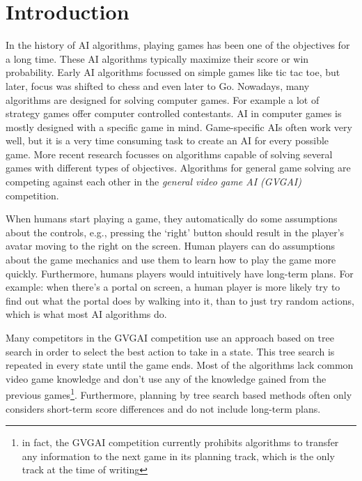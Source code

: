\section{Introduction}
\label{sec:introduction}
In the history of AI algorithms, playing games has been one of the objectives
for a long time. These AI algorithms typically maximize their score or win
probability. Early AI algorithms focussed on simple games like tic tac toe, but
later, focus was shifted to chess and even later to Go. Nowadays, many
algorithms are designed for solving computer games. For example a lot of
strategy games offer computer controlled contestants. AI in computer games is
mostly designed with a specific game in mind.  
Game-specific AIs often work very well, but it is a very time consuming
task to create an AI for every possible game. More recent research focusses
on algorithms capable of solving several games with different types of
objectives. Algorithms for general game solving are competing against each other
in the \emph{general video game AI (GVGAI)} competition\cite{perez2014}. 

When humans start playing a game, they automatically do some assumptions about
the controls, e.g., pressing the `right' button should result in the player's
avatar moving to the right on the screen. Human players can do
assumptions about the game mechanics and use them to learn how to play the game
more quickly. Furthermore, humans players would intuitively have long-term
plans.  For example: when there's a portal on screen, a human player is more
likely try to find out what the portal does by walking into it, than to just try
random actions, which is what most AI algorithms do.

Many competitors in the GVGAI competition use an approach based on tree
search in order to select the best action to take in a state. This tree search
is repeated in every state until the game ends. Most of the algorithms lack
common video game knowledge and don't use any of the knowledge gained from the
previous games\footnote{in fact, the GVGAI competition currently prohibits algorithms to
transfer any information to the next game in its planning track, which is the
only track at the time of writing}. Furthermore, planning by tree search based
methods often only considers short-term score differences and do not include
long-term plans.

